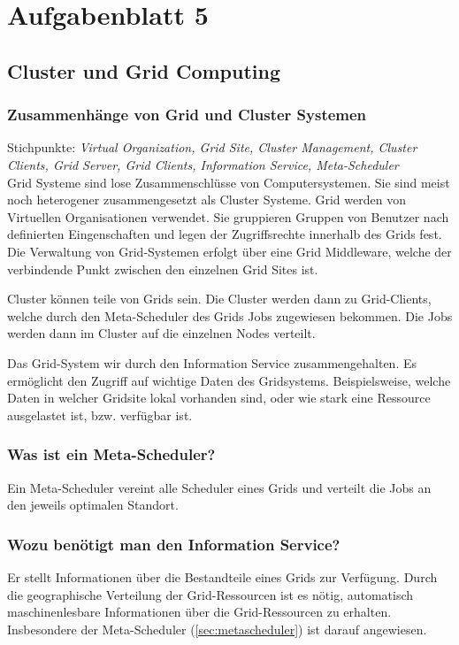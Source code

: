 \section{Aufgabenblatt 5}
\subsection{Cluster und Grid Computing}

	\subsubsection*{Zusammenhänge von Grid und Cluster Systemen}
	{\scriptsize Stichpunkte: \textsl{Virtual Organization, Grid Site, Cluster Management, Cluster Clients, Grid Server, Grid Clients, Information Service, Meta-Scheduler} } \\
	
		Grid Systeme sind lose Zusammenschlüsse von Computersystemen.
		Sie sind meist noch heterogener zusammengesetzt als Cluster Systeme.
		Grid werden von Virtuellen Organisationen verwendet.
		Sie gruppieren Gruppen von Benutzer nach definierten Eingenschaften
		und legen der Zugriffsrechte innerhalb des Grids fest.
		Die Verwaltung von Grid-Systemen erfolgt über eine Grid Middleware,
		welche der verbindende Punkt zwischen den einzelnen Grid Sites ist.
		
		Cluster können teile von Grids sein.
		Die Cluster werden dann zu Grid-Clients,
		welche durch den Meta-Scheduler des Grids Jobs zugewiesen bekommen.
		Die Jobs werden dann im Cluster auf die einzelnen Nodes verteilt.
		
		Das Grid-System wir durch den Information Service zusammengehalten.
		Es ermöglicht den Zugriff auf wichtige Daten des Gridsystems.
		Beispielsweise, welche Daten in welcher Gridsite lokal vorhanden sind,
		oder wie stark eine Ressource ausgelastet ist, bzw. verfügbar ist.

	\subsubsection*{Was ist ein Meta-Scheduler?}
		\label{sec:metascheduler}
		Ein Meta-Scheduler vereint alle Scheduler eines Grids und
		verteilt die Jobs an den jeweils optimalen Standort.
		
	\subsubsection*{Wozu benötigt man den Information Service?}
		Er stellt Informationen über die Bestandteile eines Grids zur Verfügung.
		Durch die geographische Verteilung der Grid-Ressourcen ist es nötig,
		automatisch maschinenlesbare Informationen über die Grid-Ressourcen zu erhalten.
		Insbesondere der Meta-Scheduler (\ref{sec:metascheduler}) ist darauf angewiesen.
		
